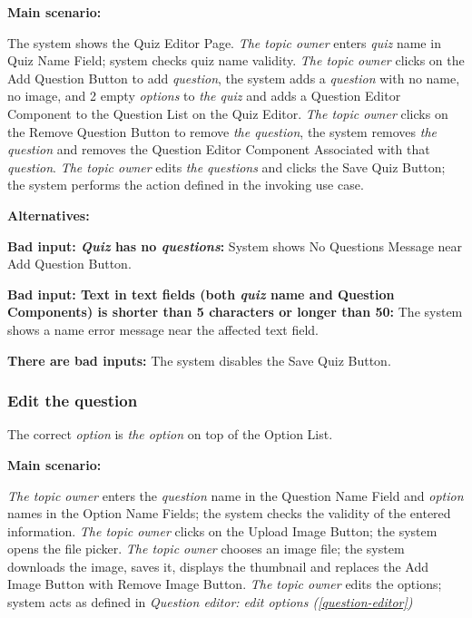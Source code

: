\documentclass[
    english, %
]{VUMIFPSkursinis}
\begin{document}
\noindent\textbf{\fontsize{13}{15}\selectfont Main scenario:}

The system shows the Quiz Editor Page. \textit{The topic owner} enters \textit{quiz} name in Quiz Name Field; system checks quiz name validity. \textit{The topic owner} clicks on the Add Question Button to add \textit{question}, the system adds a \textit{question} with no name, no image, and 2 empty \textit{options} to \textit{the quiz} and adds a Question Editor Component to the Question List on the Quiz Editor. \textit{The topic owner} clicks on the Remove Question Button to remove \textit{the question}, the system removes \textit{the question} and removes the Question Editor Component Associated with that \textit{question}. \textit{The topic owner} edits \textit{the questions} and clicks the Save Quiz Button; the system performs the action defined in the invoking use case.

\noindent\textbf{\fontsize{13}{15}\selectfont Alternatives:}

\textbf{Bad input: \textit{Quiz} has no \textit{questions}:} System shows No Questions Message near Add Question Button.

\textbf{Bad input: Text in text fields (both \textit{quiz} name and Question Components) is shorter than 5 characters or longer than 50:} The system shows a name error message near the affected text field.

\textbf{There are bad inputs:} The system disables the Save Quiz Button.

\subsubsection{Edit the question}

The correct \textit{option} is \textit{the option} on top of the Option List.

\noindent\textbf{\fontsize{13}{15}\selectfont Main scenario:}

\textit{The topic owner} enters the \textit{question} name in the Question Name Field and \textit{option} names in the Option Name Fields; the system checks the validity of the entered information. \textit{The topic owner} clicks on the Upload Image Button; the system opens the file picker. \textit{The topic owner} chooses an image file; the system downloads the image, saves it, displays the thumbnail and replaces the Add Image Button with Remove Image Button. \textit{The topic owner} edits the options; system acts as defined in \textit{Question editor: edit options (\ref{question-editor})}
\end{document}
